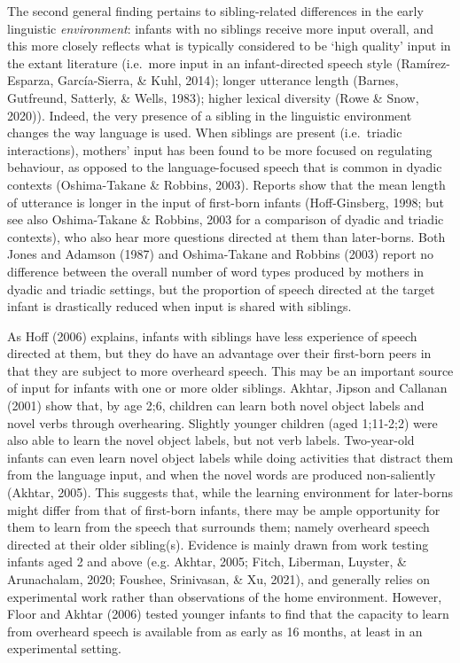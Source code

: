 \documentclass[
  man,floatsintext]{apa6}
\begin{document}
The second general finding pertains to sibling-related differences in the early linguistic \emph{environment}: infants with no siblings receive more input overall, and this more closely reflects what is typically considered to be `high quality' input in the extant literature (i.e.~more input in an infant-directed speech style (Ramírez-Esparza, García-Sierra, \& Kuhl, 2014); longer utterance length (Barnes, Gutfreund, Satterly, \& Wells, 1983); higher lexical diversity (Rowe \& Snow, 2020)). Indeed, the very presence of a sibling in the linguistic environment changes the way language is used. When siblings are present (i.e.~triadic interactions), mothers' input has been found to be more focused on regulating behaviour, as opposed to the language-focused speech that is common in dyadic contexts (Oshima-Takane \& Robbins, 2003). Reports show that the mean length of utterance is longer in the input of first-born infants (Hoff-Ginsberg, 1998; but see also Oshima-Takane \& Robbins, 2003 for a comparison of dyadic and triadic contexts), who also hear more questions directed at them than later-borns. Both Jones and Adamson (1987) and Oshima-Takane and Robbins (2003) report no difference between the overall number of word types produced by mothers in dyadic and triadic settings, but the proportion of speech directed at the target infant is drastically reduced when input is shared with siblings.

As Hoff (2006) explains, infants with siblings have less experience of speech directed at them, but they do have an advantage over their first-born peers in that they are subject to more overheard speech. This may be an important source of input for infants with one or more older siblings. Akhtar, Jipson and Callanan (2001) show that, by age 2;6, children can learn both novel object labels and novel verbs through overhearing. Slightly younger children (aged 1;11-2;2) were also able to learn the novel object labels, but not verb labels. Two-year-old infants can even learn novel object labels while doing activities that distract them from the language input, and when the novel words are produced non-saliently (Akhtar, 2005). This suggests that, while the learning environment for later-borns might differ from that of first-born infants, there may be ample opportunity for them to learn from the speech that surrounds them; namely overheard speech directed at their older sibling(s). Evidence is mainly drawn from work testing infants aged 2 and above (e.g. Akhtar, 2005; Fitch, Liberman, Luyster, \& Arunachalam, 2020; Foushee, Srinivasan, \& Xu, 2021), and generally relies on experimental work rather than observations of the home environment. However, Floor and Akhtar (2006) tested younger infants to find that the capacity to learn from overheard speech is available from as early as 16 months, at least in an experimental setting.
\end{document}
